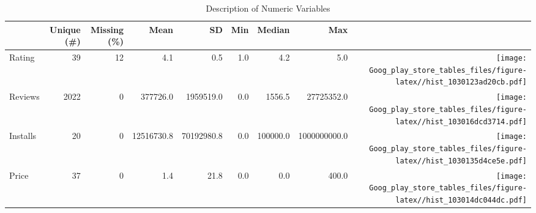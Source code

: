 \documentclass[
]{article}
\begin{document}
\begin{table}

\caption{\label{tab:unnamed-chunk-3}Description of Numeric Variables}
\centering
\begin{tabular}[t]{lrrrrrrr>{}r}
\toprule
  & Unique (\#) & Missing (\%) & Mean & SD & Min & Median & Max &   \\
\midrule
Rating & 39 & 12 & \num{4.1} & \num{0.5} & \num{1.0} & \num{4.2} & \num{5.0} & \texttt{[image: Goog\_play\_store\_tables\_files/figure-latex//hist\_1030123ad20cb.pdf]}\\
Reviews & 2022 & 0 & \num{377726.0} & \num{1959519.0} & \num{0.0} & \num{1556.5} & \num{27725352.0} & \texttt{[image: Goog\_play\_store\_tables\_files/figure-latex//hist\_103016dcd3714.pdf]}\\
Installs & 20 & 0 & \num{12516730.8} & \num{70192980.8} & \num{0.0} & \num{100000.0} & \num{1000000000.0} & \texttt{[image: Goog\_play\_store\_tables\_files/figure-latex//hist\_1030135d4ce5e.pdf]}\\
Price & 37 & 0 & \num{1.4} & \num{21.8} & \num{0.0} & \num{0.0} & \num{400.0} & \texttt{[image: Goog\_play\_store\_tables\_files/figure-latex//hist\_103014dc044dc.pdf]}\\
\bottomrule
\end{tabular}
\end{table}
\end{document}

